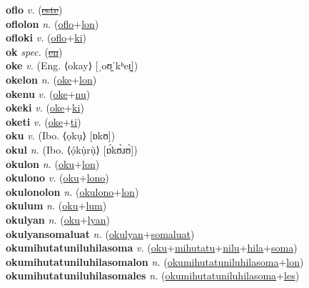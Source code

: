 \textbf{oflo} \textit{v.} (\hyperref[este]{\sout{este}})
 \label{oflo} \\
\textbf{oflolon} \textit{n.} (\hyperref[oflo]{oflo}+\hyperref[lon]{lon})
 \label{oflolon} \\
\textbf{ofloki} \textit{v.} (\hyperref[oflo]{oflo}+\hyperref[ki]{ki})
 \label{ofloki} \\
\textbf{ok} \textit{spec.} (\hyperref[en]{\sout{en}})
 \label{ok} \\
\textbf{oke} \textit{v.} (Eng. ⟨okay⟩ [ˌoʊ̯ˈkʰeɪ̯])
 \label{oke} \\
\textbf{okelon} \textit{n.} (\hyperref[oke]{oke}+\hyperref[lon]{lon})
 \label{okelon} \\
\textbf{okenu} \textit{v.} (\hyperref[oke]{oke}+\hyperref[nu]{nu})
 \label{okenu} \\
\textbf{okeki} \textit{v.} (\hyperref[oke]{oke}+\hyperref[ki]{ki})
 \label{okeki} \\
\textbf{oketi} \textit{v.} (\hyperref[oke]{oke}+\hyperref[ti]{ti})
 \label{oketi} \\
\textbf{oku} \textit{v.} (Ibo. ⟨ọkụ⟩ [ɒkʊ])
 \label{oku} \\
\textbf{okul} \textit{n.} (Ibo. ⟨ọ́kụ̀rụ̀⟩ [ɒ́kʊ̀ɹʊ̀])
 \label{okul} \\
\textbf{okulon} \textit{n.} (\hyperref[oku]{oku}+\hyperref[lon]{lon})
 \label{okulon} \\
\textbf{okulono} \textit{v.} (\hyperref[oku]{oku}+\hyperref[lono]{lono})
 \label{okulono} \\
\textbf{okulonolon} \textit{n.} (\hyperref[okulono]{okulono}+\hyperref[lon]{lon})
 \label{okulonolon} \\
\textbf{okulum} \textit{n.} (\hyperref[oku]{oku}+\hyperref[lum]{lum})
 \label{okulum} \\
\textbf{okulyan} \textit{n.} (\hyperref[oku]{oku}+\hyperref[lyan]{lyan})
 \label{okulyan} \\
\textbf{okulyansomaluat} \textit{n.} (\hyperref[okulyan]{okulyan}+\hyperref[somaluat]{somaluat})
 \label{okulyansomaluat} \\
\textbf{okumihutatuniluhilasoma} \textit{v.} (\hyperref[oku]{oku}+\hyperref[mihutatu]{mihutatu}+\hyperref[nilu]{nilu}+\hyperref[hila]{hila}+\hyperref[soma]{soma})
 \label{okumihutatuniluhilasoma} \\
\textbf{okumihutatuniluhilasomalon} \textit{n.} (\hyperref[okumihutatuniluhilasoma]{okumihutatuniluhilasoma}+\hyperref[lon]{lon})
 \label{okumihutatuniluhilasomalon} \\
\textbf{okumihutatuniluhilasomales} \textit{n.} (\hyperref[okumihutatuniluhilasoma]{okumihutatuniluhilasoma}+\hyperref[les]{les})

